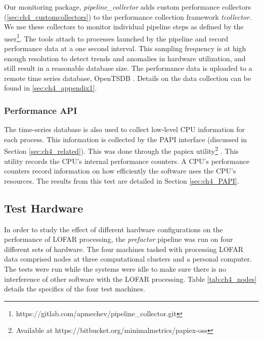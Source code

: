 Our monitoring package, \textit{pipeline\_collector} adds custom performance collectors (\ref{sec:ch4_customcollectors}) to the performance collection framework \textit{tcollector}. We use these collectors to monitor individual pipeline steps as defined by the user\footnote{https://gitlab.com/apmechev/pipeline\_collector.git}. The tools attach to processes launched by the pipeline and record performance data at a one second interval. This sampling frequency is at high enough resolution to detect trends and anomalies in hardware utilization, and still result in a reasonable database size. The performance data is uploaded to a remote time series database, OpenTSDB \citep{opentsdbsite}. Details on the data collection can be found in  \ref{sec:ch4_appendix1}.

\subsubsection{Performance API}\label{sec:ch4_papi2}

The time-series database is also used to collect low-level CPU information for each process. This information is collected by the PAPI interface (discussed in Section \ref{sec:ch4_related}). This was done through the papiex utility\footnote
{Available at https://bitbucket.org/minimalmetrics/papiex-oss} \citep{papiex}. This utility records the CPU's internal performance counters. A CPU's performance counters record information on how efficiently the software uses the CPU's resources. The results from this test are detailed in Section \ref{sec:ch4_PAPI}.

\subsection{Test Hardware}

In order to study the effect of different hardware configurations on the performance of LOFAR processing, the \textit{prefactor} pipeline was run on four different sets of hardware. The four machines tasked with processing LOFAR data comprised nodes at three computational clusters and a personal computer. The tests were run while the systems were idle to make sure there is no interference of other software with the LOFAR processing. Table \ref{tab:ch4_nodes} details the specifics of the four test machines.

